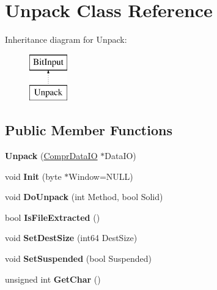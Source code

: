 \hypertarget{class_unpack}{\section{Unpack Class Reference}
\label{class_unpack}
}
Inheritance diagram for Unpack\-:\begin{figure}[H]
\begin{center}
\leavevmode
\includegraphics[height=2.000000cm]{class_unpack}
\end{center}
\end{figure}
\subsection*{Public Member Functions}
\begin{DoxyCompactItemize}
\item 
\hypertarget{class_unpack_af5593e68f5e3e295a625555827e43fc1}{{\bfseries Unpack} (\hyperlink{class_compr_data_i_o}{Compr\-Data\-I\-O} $\ast$Data\-I\-O)}\label{class_unpack_af5593e68f5e3e295a625555827e43fc1}

\item 
\hypertarget{class_unpack_a05f04f77abe389b1d755771ca3df3b56}{void {\bfseries Init} (byte $\ast$Window=N\-U\-L\-L)}\label{class_unpack_a05f04f77abe389b1d755771ca3df3b56}

\item 
\hypertarget{class_unpack_ab0891c4f27fc029dc185b68d164f91ea}{void {\bfseries Do\-Unpack} (int Method, bool Solid)}\label{class_unpack_ab0891c4f27fc029dc185b68d164f91ea}

\item 
\hypertarget{class_unpack_a9ffdd702fc7a20cbd09bae52d5817bfe}{bool {\bfseries Is\-File\-Extracted} ()}\label{class_unpack_a9ffdd702fc7a20cbd09bae52d5817bfe}

\item 
\hypertarget{class_unpack_ab7415d69f73a5c29638dd14a091f2414}{void {\bfseries Set\-Dest\-Size} (int64 Dest\-Size)}\label{class_unpack_ab7415d69f73a5c29638dd14a091f2414}

\item 
\hypertarget{class_unpack_a80b0c836f1f795dca8e7f0a9ea9405a5}{void {\bfseries Set\-Suspended} (bool Suspended)}\label{class_unpack_a80b0c836f1f795dca8e7f0a9ea9405a5}

\item 
\hypertarget{class_unpack_a9af22d08aec9134c7b878ea4ddc21dc4}{unsigned int {\bfseries Get\-Char} ()}\label{class_unpack_a9af22d08aec9134c7b878ea4ddc21dc4}

\end{DoxyCompactItemize}

